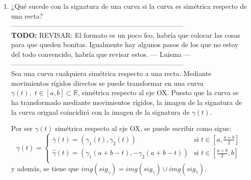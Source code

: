\documentclass[12pt,a4paper]{article}
\newcommand{\todo}[1]{{\large \color{red} \textbf{TODO: }#1 }}
\begin{document}
\begin{enumerate}
\item ¿Qué sucede con la signatura de una curva si la curva es simétrica
  respecto de una recta? \\
  ---------------------------------------------------------------------------\\
  \todo{REVISAR: El formato es un poco feo, habría que colocar las cosas
    para que queden bonitas. Igualmente hay algunos pasos de los que no
    estoy del todo convencido, habría que revisar estos. \tiny --- Luisma ---}\\
  ---------------------------------------------------------------------------\\
  Sea una curva cualquiera simétrica respecto a una recta. Mediante
  movimientos rígidos directos se puede transformar en una curva
  $\gamma(t),\,\, t\in[a,b]\subset\mathbb{R}$, simétrica respecto al eje
  OX. Puesto que la curva se ha transformado mediante movimientos rígidos,
  la imagen de la signatura de la curva orignal coincidirá con la imagen de
  la signatura de $\gamma(t)$.

  Por ser $\gamma(t)$ simétrica respecto al eje OX, se puede escribir como
  sigue:
  $$\gamma(t)=\left\{
    \begin{array}{ll}
      \bar{\gamma}(t)=(\gamma_{1}(t), \gamma_{2}(t)) & \mbox{si } t\in[a, \frac{a+b}{2}] \\
      \hat{\gamma}(t)=(\gamma_{1}(a+b-t), -\gamma_{2}(a+b-t)) & \mbox{si }
                                                                t\in[
                                                                \frac{a+b}{2},
                                                                b]\\
    \end{array}
  \right.$$
  y además, se tiene que $img(sig_{\gamma}) = img(sig_{\bar{\gamma}}) \cup
  img(sig_{\hat{\gamma}})$.\\


\end{enumerate}
\end{document}
